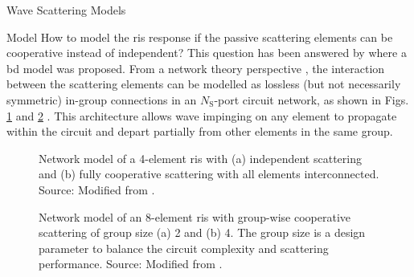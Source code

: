 \begin{section}{}
\begin{subsection}{Wave Scattering Models}
		\begin{subsubsection}{ Model}
			How to model the \gls{ris} response if the passive scattering elements can be cooperative instead of independent?
			This question has been answered by \cite{Shen2020a} where a \gls{bd} model was proposed.
			From a network theory perspective \cite{Ivrlac2010}, the interaction between the scattering elements can be modelled as lossless (but not necessarily symmetric) in-group connections in an $N_\mathrm{S}$-port circuit network, as shown in Figs. \ref{fg:bd_ris_architecture_1} and \ref{fg:bd_ris_architecture_2} \cite{Shen2020a}.
			This architecture allows wave impinging on any element to propagate within the circuit and depart partially from other elements in the same group.
			\begin{figure}[H]
				\centering
				\caption{Network model of a 4-element \gls{ris} with (a) independent scattering and (b) fully cooperative scattering with all elements interconnected. Source: Modified from \cite{Shen2020a}.}
				\label{fg:bd_ris_architecture_1}
			\end{figure}
			\begin{figure}[H]
				\centering
				\caption{Network model of an 8-element \gls{ris} with group-wise cooperative scattering of group size (a) 2 and (b) 4. The group size is a design parameter to balance the circuit complexity and scattering performance. Source: Modified from \cite{Shen2020a}.}
				\label{fg:bd_ris_architecture_2}
			\end{figure}


\end{subsubsection}
\end{subsection}
\end{section}
